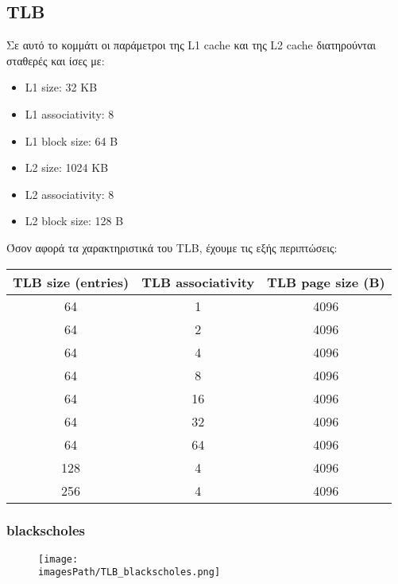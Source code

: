 \documentclass[12pt,a4paper]{article}
\newcommand{\imagesPath}{parsec-3.0/parsec_workspace/graphs}
\begin{document}
		\subsection{TLB}
			Σε αυτό το κομμάτι οι παράμετροι της L1 cache και της L2 cache διατηρούνται σταθερές και ίσες με:
			
			\begin{itemize}
				\item L1 size: 32 KB
				\item L1 associativity: 8
				\item L1 block size: 64 B
				\item L2 size: 1024 KB
				\item L2 associativity: 8
				\item L2 block size: 128 B
			\end{itemize}
			
			Όσον αφορά τα χαρακτηριστικά του TLB, έχουμε τις εξής περιπτώσεις:
			
			\begin{center}
				\begin{tabular}{|c|c|c|}
					\hline
					TLB size (entries) & TLB associativity & TLB page size (B) \\
					\hline
					64 & 1 & 4096 \\
					\hline
					64 & 2 & 4096 \\
					\hline
					64 & 4 & 4096 \\
					\hline
					64 & 8 & 4096 \\
					\hline
					64 & 16 & 4096 \\
					\hline
					64 & 32 & 4096 \\
					\hline
					64 & 64 & 4096 \\
					\hline
					128 & 4 & 4096 \\
					\hline
					256 & 4 & 4096 \\
					\hline
				\end{tabular}
			\end{center}
		
			\subsubsection{blackscholes}
				\begin{figure}[H]
					\begin{center}
						\texttt{[image: \\imagesPath/TLB\_blackscholes.png]}
					\end{center}
				\end{figure}
						
\end{document}

